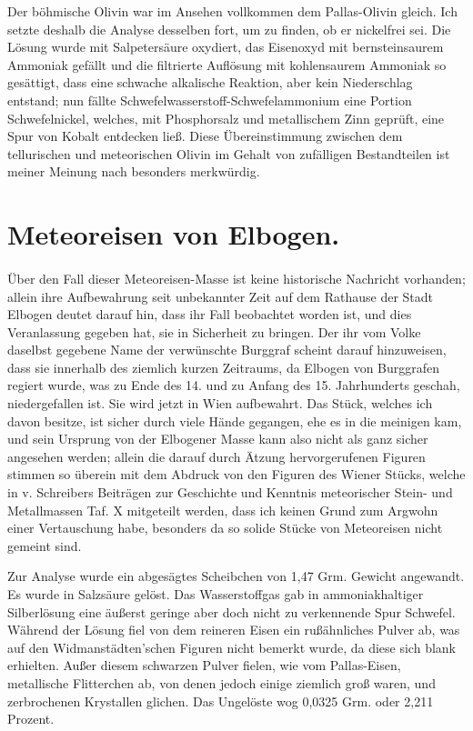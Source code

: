 \documentclass[a4paper, 11pt, oneside]{article}
\begin{document}
Der böhmische Olivin war im Ansehen vollkommen dem Pallas-Olivin gleich. Ich setzte deshalb die Analyse desselben fort, um zu finden, ob er nickelfrei sei. Die Lösung wurde mit Salpetersäure oxydiert, das Eisenoxyd mit bernsteinsaurem Ammoniak gefällt und die filtrierte Auflösung mit kohlensaurem Ammoniak so gesättigt, dass eine schwache alkalische Reaktion, aber kein Niederschlag entstand; nun fällte Schwefelwasserstoff-Schwefelammonium eine Portion Schwefelnickel, welches, mit Phosphorsalz und metallischem Zinn geprüft, eine Spur von Kobalt entdecken ließ. Diese Übereinstimmung zwischen dem tellurischen und meteorischen Olivin im Gehalt von zufälligen Bestandteilen ist meiner Meinung nach besonders merkwürdig.

\section{Meteoreisen von Elbogen.}
\paragraph{}
Über den Fall dieser Meteoreisen-Masse ist keine historische Nachricht vorhanden; allein ihre Aufbewahrung seit unbekannter Zeit auf dem Rathause der Stadt Elbogen deutet darauf hin, dass ihr Fall beobachtet worden ist, und dies Veranlassung gegeben hat, sie in Sicherheit zu bringen. Der ihr vom Volke daselbst gegebene Name der verwünschte Burggraf scheint darauf hinzuweisen, dass sie innerhalb des ziemlich kurzen Zeitraums, da Elbogen von Burggrafen regiert wurde, was zu Ende des 14. und zu Anfang des 15. Jahrhunderts geschah, niedergefallen ist. Sie wird jetzt in Wien aufbewahrt. Das Stück, welches ich davon besitze, ist sicher durch viele Hände gegangen, ehe es in die meinigen kam, und sein Ursprung von der Elbogener Masse kann also nicht als ganz sicher angesehen werden; allein die darauf durch Ätzung hervorgerufenen Figuren stimmen so überein mit dem Abdruck von den Figuren des Wiener Stücks, welche in v. Schreibers Beiträgen zur Geschichte und Kenntnis meteorischer Stein- und Metallmassen Taf. X mitgeteilt werden, dass ich keinen Grund zum Argwohn einer Vertauschung habe, besonders da so solide Stücke von Meteoreisen nicht gemeint sind.

Zur Analyse wurde ein abgesägtes Scheibchen von 1,47 Grm. Gewicht angewandt. Es wurde in Salzsäure gelöst. Das Wasserstoffgas gab in ammoniakhaltiger Silberlösung eine äußerst geringe aber doch nicht zu verkennende Spur Schwefel. Während der Lösung fiel von dem reineren Eisen ein rußähnliches Pulver ab, was auf den Widmanstädten’schen Figuren nicht bemerkt wurde, da diese sich blank erhielten. Außer diesem schwarzen Pulver fielen, wie vom Pallas-Eisen, metallische Flitterchen ab, von denen jedoch einige ziemlich groß waren, und zerbrochenen Krystallen glichen. Das Ungelöste wog 0,0325 Grm. oder 2,211 Prozent.
\end{document}
